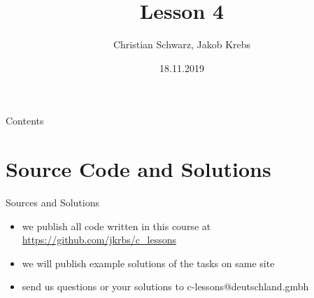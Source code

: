 \documentclass[10pt,graphics,aspectratio=169,table]{beamer}
\title{Lesson 4}
\author{Christian Schwarz, Jakob Krebs}
\date{18.11.2019}
\begin{document}
\maketitle

\begin{frame}{Contents}
    \tableofcontents
\end{frame}


\section{Source Code and Solutions}
\begin{frame}{Sources and Solutions}
    \begin{itemize}
        \item we publish all code written in this course at \url{https://github.com/jkrbs/c_lessons}
        \item we will publish example solutions of the tasks on same site
        \item send us questions or your solutions to c-lessons@deutschland.gmbh
    \end{itemize}
\end{frame}
\end{document}
